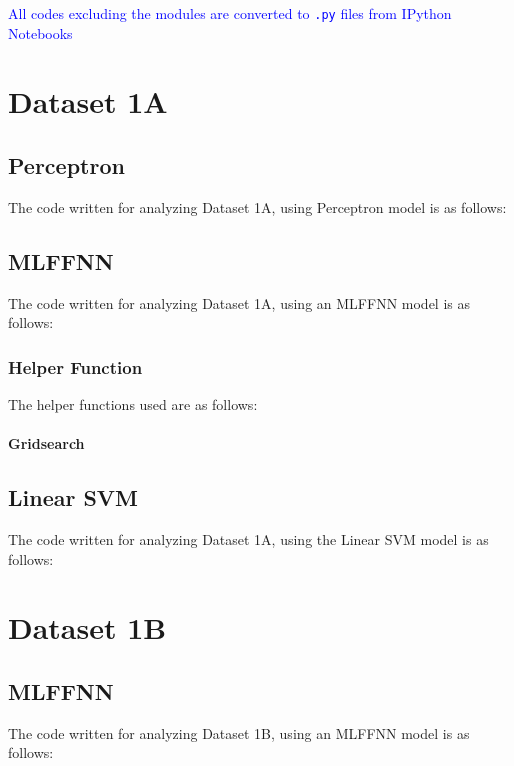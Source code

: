 \documentclass[11pt,a4paper]{article}
\newcommand{\noi}{\noindent}
\def\tt#1{\texttt{#1}}
\begin{document}
{\hypersetup{linkcolor=black}
 \tableofcontents}
\break

\noi
\textcolor{blue}{All codes excluding the modules are converted to \tt{.py} files from IPython Notebooks}

\section{Dataset 1A}
\subsection{Perceptron}
The code written for analyzing Dataset 1A, using Perceptron model is as follows:\vspace{-1em}


\subsection{MLFFNN}
The code written for analyzing Dataset 1A, using an MLFFNN model is as follows:\vspace{-1em}


\subsubsection{Helper Function}
The helper functions used are as follows:\vspace{-1em}
\paragraph{Gridsearch}
\vspace{-1.5em}



\subsection{Linear SVM}
The code written for analyzing Dataset 1A, using the Linear SVM model is as follows:\vspace{-1em}


\section{Dataset 1B}
\subsection{MLFFNN}
The code written for analyzing Dataset 1B, using an MLFFNN model is as follows:\vspace{-1em}

\end{document}
